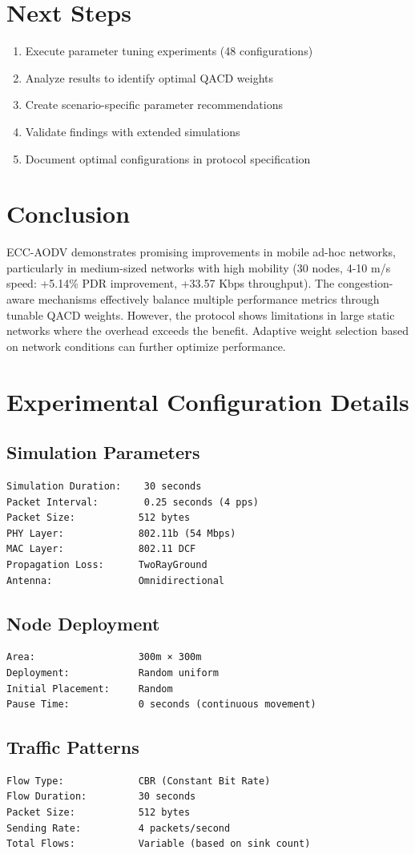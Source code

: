 \documentclass[11pt,a4paper]{article}
\begin{document}
\section{Next Steps}

\begin{enumerate}
    \item Execute parameter tuning experiments (48 configurations)
    \item Analyze results to identify optimal QACD weights
    \item Create scenario-specific parameter recommendations
    \item Validate findings with extended simulations
    \item Document optimal configurations in protocol specification
\end{enumerate}

\section{Conclusion}

ECC-AODV demonstrates promising improvements in mobile ad-hoc networks, particularly in medium-sized networks with high mobility (30 nodes, 4-10 m/s speed: +5.14\% PDR improvement, +33.57 Kbps throughput). The congestion-aware mechanisms effectively balance multiple performance metrics through tunable QACD weights. However, the protocol shows limitations in large static networks where the overhead exceeds the benefit. Adaptive weight selection based on network conditions can further optimize performance.

\appendix

\section{Experimental Configuration Details}

\subsection{Simulation Parameters}
\begin{verbatim}
Simulation Duration:    30 seconds
Packet Interval:        0.25 seconds (4 pps)
Packet Size:           512 bytes
PHY Layer:             802.11b (54 Mbps)
MAC Layer:             802.11 DCF
Propagation Loss:      TwoRayGround
Antenna:               Omnidirectional
\end{verbatim}

\subsection{Node Deployment}
\begin{verbatim}
Area:                  300m × 300m
Deployment:            Random uniform
Initial Placement:     Random
Pause Time:            0 seconds (continuous movement)
\end{verbatim}

\subsection{Traffic Patterns}
\begin{verbatim}
Flow Type:             CBR (Constant Bit Rate)
Flow Duration:         30 seconds
Packet Size:           512 bytes
Sending Rate:          4 packets/second
Total Flows:           Variable (based on sink count)
\end{verbatim}
\end{document}
